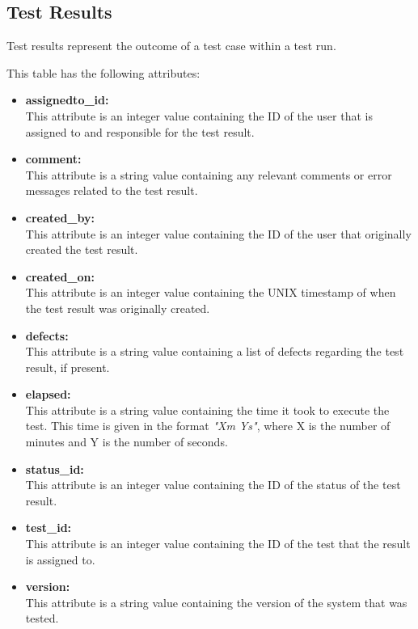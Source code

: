 \subsection{Test Results}

Test results represent the outcome of a test case within a test run. 

This table has the following attributes:~\cite{TRResults}
\begin{itemize}
    \item \textbf{assignedto_id:} \\
    This attribute is an integer value containing the ID of the user that is assigned to and responsible for the test result.

    \item \textbf{comment:} \\
    This attribute is a string value containing any relevant comments or error messages related to the test result.

    \item \textbf{created_by:} \\
    This attribute is an integer value containing the ID of the user that originally created the test result.

    \item \textbf{created_on:} \\
    This attribute is an integer value containing the UNIX timestamp of when the test result was originally created.

    \item \textbf{defects:} \\
    This attribute is a string value containing a list of defects regarding the test result, if present.

    \item \textbf{elapsed:} \\
    This attribute is a string value containing the time it took to execute the test. This time is given in the format \textit{"Xm Ys"}, where X is the number of minutes and Y is the number of seconds.

    \item \textbf{status_id:} \\
    This attribute is an integer value containing the ID of the status of the test result.

    \item \textbf{test_id:} \\
    This attribute is an integer value containing the ID of the test that the result is assigned to.

    \item \textbf{version:} \\
    This attribute is a string value containing the version of the system that was tested.
\end{itemize}

